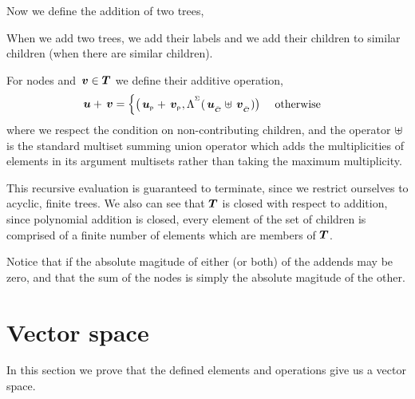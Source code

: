 Now we define the addition of two trees,
\begin{definition}
  \label{treeaddition}
  When we add two trees, we add their labels and we add their children
  to similar children (when there are similar children).  

  For nodes  and $\,\boldsymbol{v} \in \boldsymbol{T}$ we define their additive operation,
  \begin{align*}
    \,\boldsymbol{u} + \,\boldsymbol{v} &= \begin{cases}
      \bigl({\,\boldsymbol{u}}_{{}_{\mathsf{P}}} + {\,\boldsymbol{v}}_{{}_{\mathsf{P}}}, \Lambda^{{}^{\Sigma}}({\,\boldsymbol{u}}_{{}_{\bar{\boldsymbol{C}}}} \uplus {\,\boldsymbol{v}}_{{}_{\bar{\boldsymbol{C}}}})\bigr) & \text{ otherwise}
    \end{cases}
  \end{align*}
  where we respect the condition on non-contributing children, and 
  the operator $\uplus$ is the standard multiset summing union operator
  which adds the multiplicities of elements in its argument multisets rather than taking
  the maximum multiplicity.

  This recursive evaluation is guaranteed to terminate, since we restrict
  ourselves to acyclic, finite trees.  We also can see that $\boldsymbol{T}$ is
  closed with respect to addition, since polynomial addition is
  closed, every element of the set of children is comprised of a
  finite number of elements which are members of $\boldsymbol{T}$.

  Notice that if the absolute magitude of either (or both) of the addends
  may be zero, and that the sum of the nodes is simply the absolute
  magitude of the other.
\end{definition}



\section{Vector space}
In this section we prove that the defined elements and operations give
us a vector space.  


